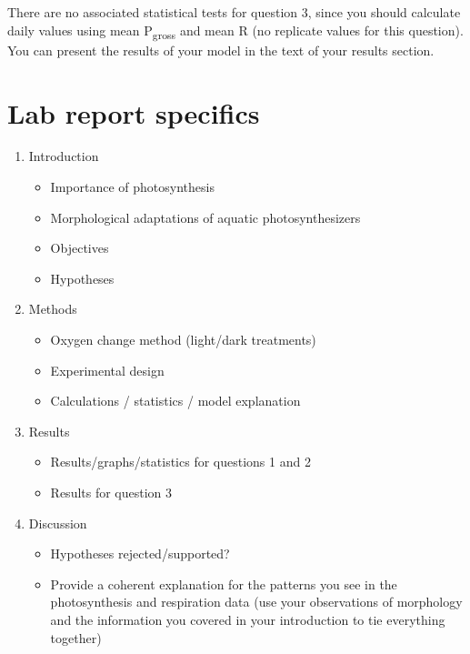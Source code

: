 \documentclass[]{book}
\providecommand{\tightlist}{%
  \setlength{\itemsep}{0pt}\setlength{\parskip}{0pt}}
\begin{document}
There are no associated statistical tests for question 3, since you should calculate daily values using mean P\textsubscript{gross} and mean R (no replicate values for this question). You can present the results of your model in the text of your results section.

\pagebreak

\hypertarget{lab-report-specifics-1}{%
\section{Lab report specifics}\label{lab-report-specifics-1}}

\begin{enumerate}
\def\labelenumi{\arabic{enumi}.}
\tightlist
\item
  Introduction

  \begin{itemize}
  \tightlist
  \item
    Importance of photosynthesis
  \item
    Morphological adaptations of aquatic photosynthesizers
  \item
    Objectives
  \item
    Hypotheses
  \end{itemize}
\item
  Methods

  \begin{itemize}
  \tightlist
  \item
    Oxygen change method (light/dark treatments)
  \item
    Experimental design
  \item
    Calculations / statistics / model explanation
  \end{itemize}
\item
  Results

  \begin{itemize}
  \tightlist
  \item
    Results/graphs/statistics for questions 1 and 2
  \item
    Results for question 3
  \end{itemize}
\item
  Discussion

  \begin{itemize}
  \tightlist
  \item
    Hypotheses rejected/supported?
  \item
    Provide a coherent explanation for the patterns you see in the photosynthesis and respiration data (use your observations of morphology and the information you covered in your introduction to tie everything together)
  \end{itemize}
\end{enumerate}
\end{document}
